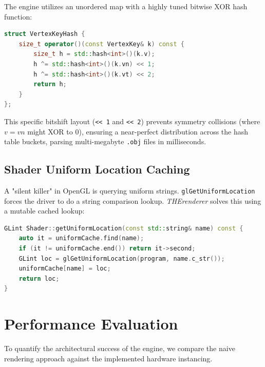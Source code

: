 \documentclass[12pt,a4paper]{article}
\begin{document}
The engine utilizes an unordered map with a highly tuned bitwise XOR hash function:
\begin{lstlisting}[language=C++]
struct VertexKeyHash {
    size_t operator()(const VertexKey& k) const {
        size_t h = std::hash<int>()(k.v);
        h ^= std::hash<int>()(k.vn) << 1;
        h ^= std::hash<int>()(k.vt) << 2;
        return h;
    }
};
\end{lstlisting}
This specific bitshift layout (\texttt{<< 1} and \texttt{<< 2}) prevents symmetry collisions (where $v = vn$ might XOR to $0$), ensuring a near-perfect distribution across the hash table buckets, parsing multi-megabyte \texttt{.obj} files in milliseconds.

\subsection{Shader Uniform Location Caching}
A "silent killer" in OpenGL is querying uniform strings. \texttt{glGetUniformLocation} forces the driver to do a string comparison lookup. \textit{THErenderer} solves this using a mutable cached lookup:
\begin{lstlisting}[language=C++]
GLint Shader::getUniformLocation(const std::string& name) const {
    auto it = uniformCache.find(name);
    if (it != uniformCache.end()) return it->second;
    GLint loc = glGetUniformLocation(program, name.c_str());
    uniformCache[name] = loc;
    return loc;
}
\end{lstlisting}

\section{Performance Evaluation}

To quantify the architectural success of the engine, we compare the naive rendering approach against the implemented hardware instancing.
\end{document}
